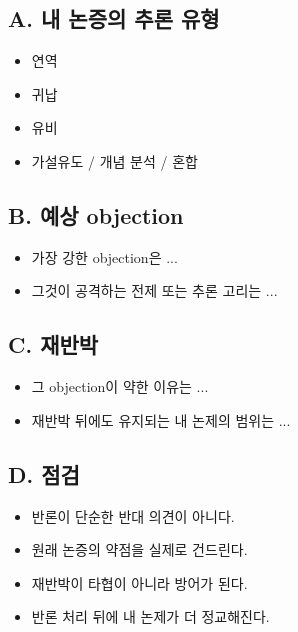 \subsection{A. 내 논증의 추론 유형}\label{a-uxb0b4-uxb17cuxc99duxc758-uxcd94uxb860-uxc720uxd615}

\begin{itemize}
\tightlist
\item[$\square$]
  연역
\item[$\square$]
  귀납
\item[$\square$]
  유비
\item[$\square$]
  가설유도 / 개념 분석 / 혼합
\end{itemize}

\subsection{B. 예상 objection}\label{b-uxc608uxc0c1-objection}

\begin{itemize}
\tightlist
\item
  가장 강한 objection은 ...
\item
  그것이 공격하는 전제 또는 추론 고리는 ...
\end{itemize}

\subsection{C. 재반박}\label{c-uxc7acuxbc18uxbc15}

\begin{itemize}
\tightlist
\item
  그 objection이 약한 이유는 ...
\item
  재반박 뒤에도 유지되는 내 논제의 범위는 ...
\end{itemize}

\subsection{D. 점검}\label{d-uxc810uxac80-2}

\begin{itemize}
\tightlist
\item[$\square$]
  반론이 단순한 반대 의견이 아니다.
\item[$\square$]
  원래 논증의 약점을 실제로 건드린다.
\item[$\square$]
  재반박이 타협이 아니라 방어가 된다.
\item[$\square$]
  반론 처리 뒤에 내 논제가 더 정교해진다.
\end{itemize}

